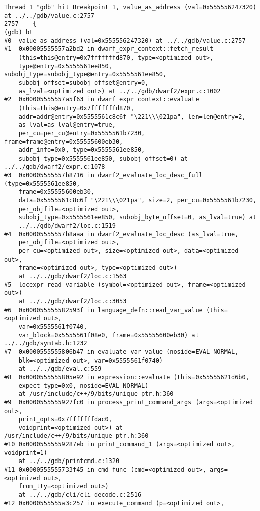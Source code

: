 \documentclass{report}
\begin{document}
\begin{verbatim}
Thread 1 "gdb" hit Breakpoint 1, value_as_address (val=0x555556247320) 
at ../../gdb/value.c:2757
2757	{
(gdb) bt
#0  value_as_address (val=0x555556247320) at ../../gdb/value.c:2757
#1  0x00005555557a2bd2 in dwarf_expr_context::fetch_result 
    (this=this@entry=0x7fffffffd870, type=<optimized out>, 
    type@entry=0x5555561ee850, subobj_type=subobj_type@entry=0x5555561ee850, 
    subobj_offset=subobj_offset@entry=0, 
    as_lval=<optimized out>) at ../../gdb/dwarf2/expr.c:1002
#2  0x00005555557a5f63 in dwarf_expr_context::evaluate 
    (this=this@entry=0x7fffffffd870, 
    addr=addr@entry=0x5555561c8c6f "\221\\\021pa", len=len@entry=2, 
    as_lval=as_lval@entry=true, 
    per_cu=per_cu@entry=0x5555561b7230, frame=frame@entry=0x55555600eb30, 
    addr_info=0x0, type=0x5555561ee850, 
    subobj_type=0x5555561ee850, subobj_offset=0) at ../../gdb/dwarf2/expr.c:1078
#3  0x00005555557b8716 in dwarf2_evaluate_loc_desc_full (type=0x5555561ee850, 
    frame=0x55555600eb30, 
    data=0x5555561c8c6f "\221\\\021pa", size=2, per_cu=0x5555561b7230, 
    per_objfile=<optimized out>, 
    subobj_type=0x5555561ee850, subobj_byte_offset=0, as_lval=true) at 
    ../../gdb/dwarf2/loc.c:1519
#4  0x00005555557b8aaa in dwarf2_evaluate_loc_desc (as_lval=true, 
    per_objfile=<optimized out>, 
    per_cu=<optimized out>, size=<optimized out>, data=<optimized out>, 
    frame=<optimized out>, type=<optimized out>)
    at ../../gdb/dwarf2/loc.c:1563
#5  locexpr_read_variable (symbol=<optimized out>, frame=<optimized out>) 
    at ../../gdb/dwarf2/loc.c:3053
#6  0x000055555582593f in language_defn::read_var_value (this=<optimized out>, 
    var=0x5555561f0740, 
    var_block=0x5555561f08e0, frame=0x55555600eb30) at ../../gdb/symtab.h:1232
#7  0x0000555555806b47 in evaluate_var_value (noside=EVAL_NORMAL, 
    blk=<optimized out>, var=0x5555561f0740)
    at ../../gdb/eval.c:559
#8  0x0000555555805e92 in expression::evaluate (this=0x55555621d6b0, 
    expect_type=0x0, noside=EVAL_NORMAL)
    at /usr/include/c++/9/bits/unique_ptr.h:360
#9  0x0000555555927fc0 in process_print_command_args (args=<optimized out>, 
    print_opts=0x7fffffffdac0, 
    voidprint=<optimized out>) at /usr/include/c++/9/bits/unique_ptr.h:360
#10 0x00005555559287eb in print_command_1 (args=<optimized out>, voidprint=1)
    at ../../gdb/printcmd.c:1320
#11 0x0000555555733f45 in cmd_func (cmd=<optimized out>, args=<optimized out>, 
    from_tty=<optimized out>)
    at ../../gdb/cli/cli-decode.c:2516
#12 0x0000555555a3c257 in execute_command (p=<optimized out>, 

\end{verbatim}
\end{document}
